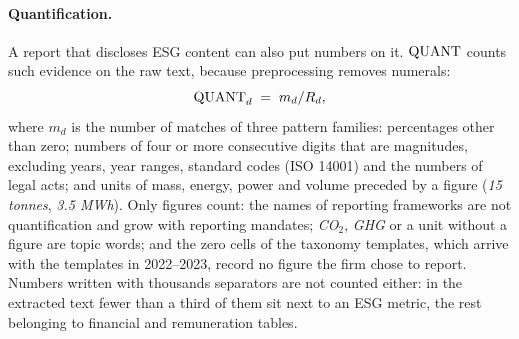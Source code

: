 \paragraph{Quantification.} A report that discloses ESG content can also put
numbers on it. $\mathrm{QUANT}$ counts such evidence on the raw text, because
preprocessing removes numerals:
\[
\mathrm{QUANT}_d \;=\; m_d / R_d,
\]
where $m_d$ is the number of matches of three pattern families: percentages
other than zero; numbers of four or more consecutive digits that are
magnitudes, excluding years, year ranges, standard codes (ISO 14001) and the
numbers of legal acts; and units of mass, energy, power and volume preceded by
a figure (\emph{15 tonnes}, \emph{3.5 MWh}). Only figures count: the names of
reporting frameworks are not quantification and grow with reporting mandates;
\emph{CO$_2$}, \emph{GHG} or a unit without a figure are topic words; and the
zero cells of the taxonomy templates, which arrive with the templates in
2022--2023, record no figure the firm chose to report. Numbers written with
thousands separators are not counted either: in the extracted text fewer than
a third of them sit next to an ESG metric, the rest belonging to financial and
remuneration tables.

